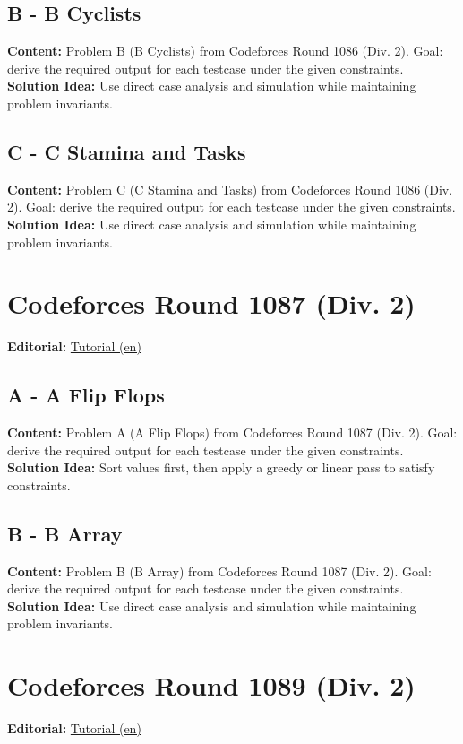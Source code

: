 \documentclass[11pt]{article}
\begin{document}
\subsection{B - B Cyclists}
\textbf{Content:} Problem B (B Cyclists) from Codeforces Round 1086 (Div. 2). Goal: derive the required output for each testcase under the given constraints.\\
\textbf{Solution Idea:} Use direct case analysis and simulation while maintaining problem invariants.

\subsection{C - C Stamina and Tasks}
\textbf{Content:} Problem C (C Stamina and Tasks) from Codeforces Round 1086 (Div. 2). Goal: derive the required output for each testcase under the given constraints.\\
\textbf{Solution Idea:} Use direct case analysis and simulation while maintaining problem invariants.

\section{Codeforces Round 1087 (Div. 2)}
\textbf{Editorial:} \href{https://codeforces.com/blog/entry/152272}{Tutorial (en)}

\subsection{A - A Flip Flops}
\textbf{Content:} Problem A (A Flip Flops) from Codeforces Round 1087 (Div. 2). Goal: derive the required output for each testcase under the given constraints.\\
\textbf{Solution Idea:} Sort values first, then apply a greedy or linear pass to satisfy constraints.

\subsection{B - B Array}
\textbf{Content:} Problem B (B Array) from Codeforces Round 1087 (Div. 2). Goal: derive the required output for each testcase under the given constraints.\\
\textbf{Solution Idea:} Use direct case analysis and simulation while maintaining problem invariants.

\section{Codeforces Round 1089 (Div. 2)}
\textbf{Editorial:} \href{https://codeforces.com/blog/entry/152413}{Tutorial (en)}
\end{document}

